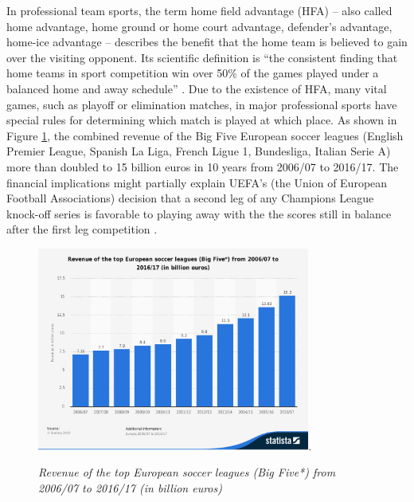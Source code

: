 \documentclass[USenglish]{article}
\begin{document}
In professional team sports, the term home field advantage (HFA) – also called home advantage, home ground or home court advantage, defender's advantage, home-ice advantage – describes the benefit that the home team is believed to gain over the visiting opponent. Its scientific definition is ``the consistent finding that home teams in sport competition win over 50\% of the games played under a balanced home and away schedule'' \citep[p. 13]{Courneya1992}.
Due to the existence of HFA, many vital games, such as playoff or elimination matches, in major professional sports have special rules for determining which match is played at which place.  As shown in Figure \ref{fig11}, the combined revenue of the Big Five European soccer leagues (English Premier League, Spanish La Liga, French Ligue 1, Bundesliga, Italian Serie A) more than doubled to 15 billion euros in 10 years from 2006/07 to 2016/17. The financial implications might partially explain UEFA's (the Union of European Football Associations) decision that a second leg of any Champions League knock-off series is favorable to playing away with the the scores still in balance after the first leg competition \citep{atkins2013}.

\begin{figure}[ht]
\caption{\textit{Revenue of the top European soccer leagues (Big Five*) from 2006/07 to 2016/17 (in billion euros)}}
\centering\includegraphics[width=0.8\textwidth]{HFA11.pdf}. 
\label{fig11}
\end{figure}
\end{document}
